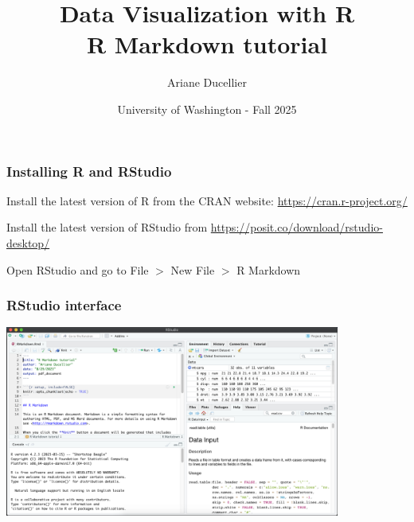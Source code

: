 \documentclass{beamer}
\title[Data Visualization with R - R Markdown tutorial]{Data Visualization with R \\ R Markdown tutorial}
\author{Ariane Ducellier}
\date{University of Washington - Fall 2025}
\begin{document}
	\begin{frame}
		\titlepage
	\end{frame}

	\begin{frame}
		\frametitle{Installing R and RStudio}

		Install the latest version of R from the CRAN website: \href{https://cran.r-project.org/}{https://cran.r-project.org/}

		\vspace{2em}

		Install the latest version of RStudio from \href{https://posit.co/download/rstudio-desktop/}{https://posit.co/download/rstudio-desktop/}

		\vspace{2em}

		Open RStudio and go to File $>$ New File $>$ R Markdown
		
	\end{frame}

	\begin{frame}
		\frametitle{RStudio interface}

		\centering
		\includegraphics[trim={0cm 0cm 0cm 0cm}, clip, width=11cm]{RMarkdown.png}
		
	\end{frame}
\end{document}
